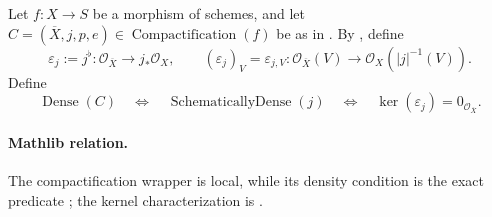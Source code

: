 \begin{definition}
  \label{def:nagata-dense-compactification}
  \lean{}

  Let \(f\colon X\to S\) be a morphism of schemes, and let
  $C=(\overline X,j,p,e)\in
  \operatorname{Compactification}(f)$ be as in
  .  By
  , define
  \[
    \varepsilon_j:=j^\flat\colon\mathcal O_{\overline X}\longrightarrow
      j_*\mathcal O_X,
    \qquad
    (\varepsilon_j)_V=\varepsilon_{j,V}\colon
      \mathcal O_{\overline X}(V)\longrightarrow
      \mathcal O_X(|j|^{-1}(V)).
  \]
  Define
  \[
    \operatorname{Dense}(C)
      \quad\Longleftrightarrow\quad
    \operatorname{SchematicallyDense}(j)
      \quad\Longleftrightarrow\quad
    \ker(\varepsilon_j)=0_{\mathcal O_{\overline X}}.
  \]

  \paragraph{Mathlib relation.}
  The compactification wrapper is local, while its density condition is the
  exact predicate
  \texttt{};
  the kernel characterization is
  \texttt{}.
\end{definition}

